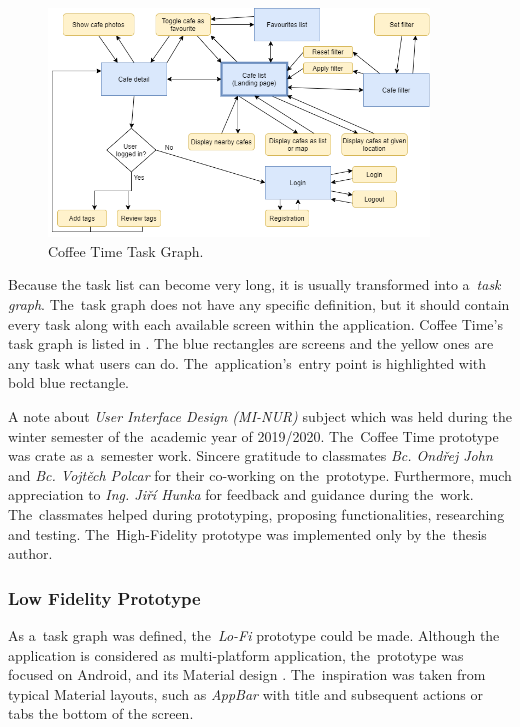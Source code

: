 \begin{figure}[htp]
    \centering
    \includegraphics[width=0.9\textwidth]{img/analysis/task-list-graph.png}
    \caption{Coffee Time Task Graph.}
    \label{fig:task-graph}
\end{figure}

Because the task list can become very long, it is usually transformed into a~\textit{task graph}. The~task graph does not have any specific definition, but it should contain every task along with each available screen within the application. Coffee Time's task graph is listed in . The blue rectangles are screens and the yellow ones are any task what users can do. The~application's~entry point is highlighted with bold blue rectangle.

A note about \textit{User Interface Design (MI-NUR)} subject which was held during the winter semester of the~academic year of 2019/2020. The~Coffee Time prototype was crate as a~semester work. Sincere gratitude to classmates \textit{Bc. Ondřej John} and \textit{Bc. Vojtěch Polcar} for their co-working on the~prototype. Furthermore, much appreciation to \textit{Ing. Jiří Hunka} for feedback and guidance during the~work. The~classmates helped during prototyping, proposing functionalities, researching and testing. The~High-Fidelity prototype was implemented only by the~thesis author. 

\subsubsection{Low Fidelity Prototype}
As a~task graph was defined, the~\textit{Lo-Fi} prototype could be made. Although the application is considered as multi-platform application, the~prototype was focused on Android, and its Material design \cite{material-design}. The~inspiration was taken from typical Material layouts, such as \textit{AppBar} with title and subsequent actions or tabs the bottom of the screen. 


